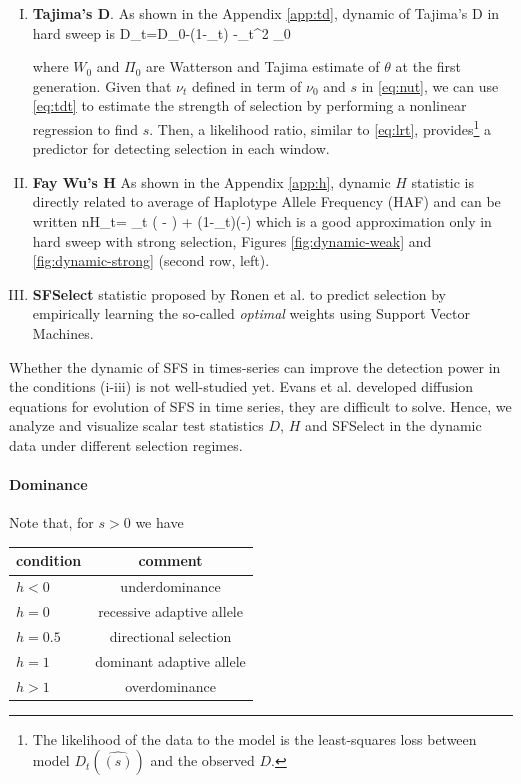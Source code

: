 \documentclass[11pt]{article}
\begin{document}
\begin{enumerate}[I.]
	\item {\bf Tajima's D}. As shown in the Appendix \ref{app:td}, dynamic of 
	Tajima's D in hard sweep is
	\beq
	D_t=D_0-\log(1-\nu_t)  -\nu_t^2 \Pi_0\label{eq:tdt}
	\eeq
	
	where $W_0$ and $\Pi_0$ are Watterson and Tajima estimate 
	of $\theta$ at 
	the first generation.
	Given that $\nu_t$ defined in term of $\nu_0$ and $s$ in 
	\eqref{eq:nut}, we 
	can use \eqref{eq:tdt} to estimate the strength of 
	selection by performing a nonlinear 
	regression to find 
	$s$. Then, a likelihood ratio, similar to \eqref{eq:lrt}, 
	provides\footnote{The 
		likelihood of the data to the model is the least-squares 
		loss between model 
		$D_t(\hat{(s)})$ and the observed $D$.} a predictor for 
	detecting selection in each window. 
	
	
	
	\item {\bf Fay Wu's H} As shown in the Appendix \ref{app:h}, dynamic $H$ 
	statistic is directly related to average of Haplotype Allele Frequency 
	(HAF) \cite{ronen2015predicting} and 
	can be written
	\beq
	nH_t= \theta \nu_t \left( - \right) +
	\theta (1-\nu_t)\left(-\right) 
	\label{eq:ht}
	\eeq
	which is a good approximation only in hard sweep with strong selection, 
	Figures 
	\ref{fig:dynamic-weak} and \ref{fig:dynamic-strong} (second
	row, left). 
	

	
	\item {\bf SFSelect} statistic proposed by Ronen et 
	al. \cite{ronen2013learning} to predict selection by empirically learning 
	the so-called \emph{optimal} weights using Support Vector Machines. 
\end{enumerate}

Whether the dynamic of SFS in times-series can improve the detection power in 
the conditions (i-iii) is not well-studied yet. Evans et al. 
\cite{evans2007non} developed diffusion equations for 
evolution of SFS in time series, they are difficult to solve. 
Hence, we analyze and visualize scalar test statistics $D$, $H$ and SFSelect 
in the dynamic data under different selection regimes.
\paragraph{Dominance}
Note that, for $s>0$ we have \cite{}  
\begin{center}
	\begin{tabular}{l|c}
		condition & comment\\
		\hline
		$h<0$ &  underdominance\\
		$h=0$ & recessive adaptive allele\\
		$h=0.5$ & directional selection\\
		$h=1$&	dominant adaptive allele	\\
		$h>1$ &overdominance
		\end{tabular}
		\end{center}
		
\end{document}
